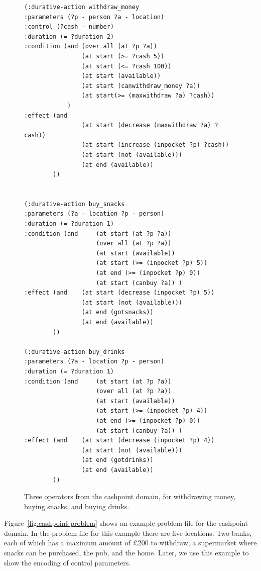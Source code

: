 \begin{figure}[thb]
\scriptsize
\begin{verbatim}
(:durative-action withdraw_money
:parameters (?p - person ?a - location)
:control (?cash - number)
:duration (= ?duration 2)
:condition (and (over all (at ?p ?a)) 
                (at start (>= ?cash 5))
                (at start (<= ?cash 100))
                (at start (available))
                (at start (canwithdraw_money ?a))
                (at start(>= (maxwithdraw ?a) ?cash))
            )
:effect (and   	
                (at start (decrease (maxwithdraw ?a) ?cash))
                (at start (increase (inpocket ?p) ?cash))
                (at start (not (available)))
                (at end (available))
        ))

        
(:durative-action buy_snacks
:parameters (?a - location ?p - person)
:duration (= ?duration 1)
:condition (and     (at start (at ?p ?a))
                    (over all (at ?p ?a))
                    (at start (available))
                    (at start (>= (inpocket ?p) 5))
                    (at end (>= (inpocket ?p) 0))
                    (at start (canbuy ?a)) )
:effect (and    (at start (decrease (inpocket ?p) 5)) 
                (at start (not (available)))
                (at end (gotsnacks))
                (at end (available))
        ))
        
(:durative-action buy_drinks
:parameters (?a - location ?p - person)
:duration (= ?duration 1)
:condition (and     (at start (at ?p ?a))
                    (over all (at ?p ?a))
                    (at start (available))
                    (at start (>= (inpocket ?p) 4))
                    (at end (>= (inpocket ?p) 0))
                    (at start (canbuy ?a)) )
:effect (and    (at start (decrease (inpocket ?p) 4)) 
                (at start (not (available)))
                (at end (gotdrinks))
                (at end (available))
        ))
\end{verbatim}
\caption{Three operators from the cashpoint domain, for withdrawing money, buying snacks, and buying drinks.}
\label{fig:actions cashpoint domain}
\end{figure}

Figure~\ref{fig:cashpoint problem} shows an example problem file for the cashpoint domain. In the problem file for this example there are five locations. Two banks, each of which has a maximum amount of \pounds200 to withdraw, a supermarket where snacks can be purchased, the pub, and the home. Later, we use this example to show the encoding of control parameters.

